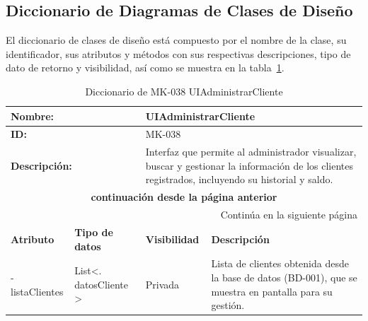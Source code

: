 \subsection{ Diccionario de Diagramas de Clases de Diseño}
El diccionario de clases de diseño está compuesto por el nombre de la clase, su identificador, sus atributos y métodos con sus respectivas descripciones, tipo de dato de retorno y visibilidad, así como se muestra en la tabla~\ref{tab:diccionarioClasesMK038}. 

\renewcommand{\arraystretch}{1.3}
\begin{longtable}{|p{3.5cm}|p{2cm}|p{2cm}|p{6cm}|}
\caption{Diccionario de MK-038 UIAdministrarCliente}
\label{tab:diccionarioClasesMK038} \\
    \hline
    \multicolumn{2}{|p{5.5cm}|}{\textbf{Nombre:}}    & \multicolumn{2}{p{6cm}|}{UIAdministrarCliente} \\
    \hline
    \multicolumn{2}{|p{5.5cm}|}{\textbf{ID:}}        & \multicolumn{2}{p{6cm}|}{MK-038} \\
    \hline
    \multicolumn{2}{|p{5.5cm}|}{\textbf{Descripción:}} 
                                              & \multicolumn{2}{p{6cm}|}{Interfaz que permite al administrador visualizar, buscar y gestionar la información de los clientes registrados, incluyendo su historial y saldo.} \\
    \hline
    \endfirsthead

    \multicolumn{4}{c}{\textbf{continuación desde la página anterior}} \\
    \endhead

    \hline \multicolumn{4}{r}{{Continúa en la siguiente página}} \\
    \endfoot    

    \hline
    \endlastfoot

    \textbf{Atributo}    & \textbf{Tipo de datos} & \textbf{Visibilidad} & \textbf{Descripción} \\
    \hline
    - listaClientes & List\textless. datosCliente \textgreater & Privada & Lista de clientes obtenida desde la base de datos (BD-001), que se muestra en pantalla para su gestión. \\
    \hline


\end{longtable}
